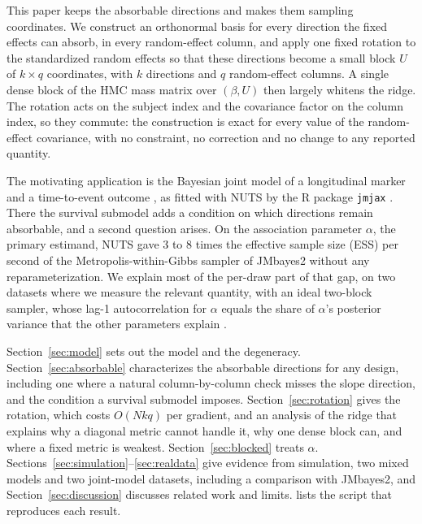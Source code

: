 This paper keeps the absorbable directions and makes them sampling
coordinates. We construct an orthonormal basis for every direction the
fixed effects can absorb, in every random-effect column, and apply one
fixed rotation to the standardized random effects so that these
directions become a small block $U$ of $k \times q$ coordinates, with $k$
directions and $q$ random-effect columns. A single dense block of the HMC
mass matrix over $(\beta, U)$ then largely whitens the ridge. The rotation
acts on the subject index and the covariance factor on the column index,
so they commute: the construction is exact for every value of the
random-effect covariance, with no constraint, no correction and no change
to any reported quantity.

The motivating application is the Bayesian joint model of a longitudinal
marker and a time-to-event outcome
\citep{wulfsohn1997,henderson2000,tsiatis2004,rizopoulos2012}, as fitted
with NUTS by the R package \texttt{jmjax} \citep{jmjax}. There the survival submodel adds
a condition on which directions remain absorbable, and a second question
arises. On the association parameter $\alpha$, the primary estimand, NUTS
gave 3 to 8 times the effective sample size (ESS) per second of the
Metropolis-within-Gibbs sampler of JMbayes2 \citep{jmbayes2} without any
reparameterization. We explain most of the per-draw part of that gap, on
two datasets where we measure the relevant quantity, with an ideal
two-block sampler, whose lag-1 autocorrelation for $\alpha$ equals
the share of $\alpha$'s posterior variance that the other parameters
explain \citep{liu1994}.

Section~\ref{sec:model} sets out the model and the degeneracy.
Section~\ref{sec:absorbable} characterizes the absorbable directions for
any design, including one where a natural column-by-column check misses
the slope direction, and the condition a survival submodel imposes.
Section~\ref{sec:rotation} gives the rotation, which costs $O(Nkq)$ per
gradient, and an analysis of the ridge that explains why a diagonal metric
cannot handle it, why one dense block can, and where a fixed metric is
weakest. Section~\ref{sec:blocked} treats $\alpha$.
Sections~\ref{sec:simulation}--\ref{sec:realdata} give evidence from
simulation, two mixed models and two joint-model datasets, including a
comparison with JMbayes2, and Section~\ref{sec:discussion} discusses
related work and limits.  lists the script that
reproduces each result.
